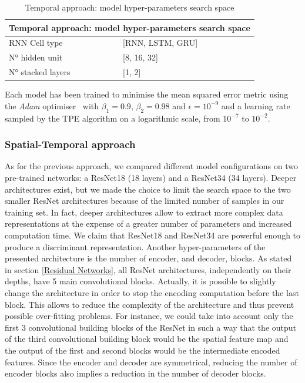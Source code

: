 \begin{table}
    \centering
    \begin{tabular}{|p{3cm}|p{4cm}| }
    \hline
    \multicolumn{2}{|c|}{Temporal approach: model hyper-parameters search space} \\
    \hline
    RNN Cell type & [RNN, LSTM, GRU] \\
    \hline
    N° hidden unit & [8, 16, 32] \\
    \hline
    N° stacked layers & [1, 2] \\
    \hline
    \end{tabular}
    \caption{Temporal approach: model hyper-parameters search space}
    \label{tab:rnn_search_space}
\end{table}
Each model has been trained to minimise the mean squared error metric using the  \textit{Adam} optimiser~\citep{kingma2014adam} with $\beta_{1} = 0.9$, $\beta_{2} = 0.98$ and $\epsilon = 10^{-9}$ and a learning rate sampled by the TPE algorithm on a logarithmic scale,  from $10^{-7}$ to $10^{-2}$. 

\subsubsection{Spatial-Temporal approach}
As for the previous approach, we compared different model configurations on two pre-trained networks: a ResNet18 (18 layers) and a ResNet34 (34 layers). Deeper architectures exist, but we made the choice to limit the search space to the two smaller ResNet architectures because of the limited number of samples in our training set. In fact, deeper architectures allow to extract more complex data representations at the expense of a greater number of parameters and increased computation time. We claim that ResNet18 and ResNet34 are powerful enough to produce a discriminant representation. Another hyper-parameters of the presented architecture is the number of encoder, and decoder, blocks. As stated in section \ref{Residual Networks}, all ResNet architectures, independently on their depths, have 5 main convolutional blocks. Actually, it is possible to slightly change the architecture in order to stop the encoding computation before the last block. This allows to reduce the complexity of the architecture and thus prevent possible over-fitting problems. For instance, we could take into account only the first 3 convolutional building blocks of the ResNet in such a way that the output of the third convolutional building block would be the spatial feature map and the output of the first and second blocks would be the intermediate encoded features. Since the encoder and decoder are symmetrical, reducing the number of encoder blocks also implies a reduction in the number of decoder blocks.

